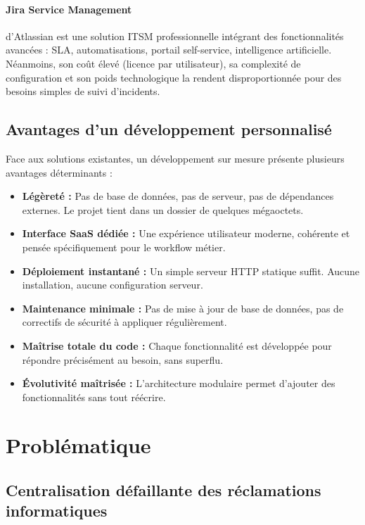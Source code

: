\documentclass[12pt,a4paper,twoside]{report}
\begin{document}
\paragraph{Jira Service Management} d'Atlassian est une solution ITSM professionnelle intégrant des fonctionnalités avancées : SLA, automatisations, portail self-service, intelligence artificielle. Néanmoins, son coût élevé (licence par utilisateur), sa complexité de configuration et son poids technologique la rendent disproportionnée pour des besoins simples de suivi d'incidents.

\subsection{Avantages d'un développement personnalisé}

Face aux solutions existantes, un développement sur mesure présente plusieurs avantages déterminants :

\begin{itemize}
    \item \textbf{Légèreté :} Pas de base de données, pas de serveur, pas de dépendances externes. Le projet tient dans un dossier de quelques mégaoctets.
    \item \textbf{Interface SaaS dédiée :} Une expérience utilisateur moderne, cohérente et pensée spécifiquement pour le workflow métier.
    \item \textbf{Déploiement instantané :} Un simple serveur HTTP statique suffit. Aucune installation, aucune configuration serveur.
    \item \textbf{Maintenance minimale :} Pas de mise à jour de base de données, pas de correctifs de sécurité à appliquer régulièrement.
    \item \textbf{Maîtrise totale du code :} Chaque fonctionnalité est développée pour répondre précisément au besoin, sans superflu.
    \item \textbf{Évolutivité maîtrisée :} L'architecture modulaire permet d'ajouter des fonctionnalités sans tout réécrire.
\end{itemize}

\section{Problématique}

\subsection{Centralisation défaillante des réclamations informatiques}
\end{document}
